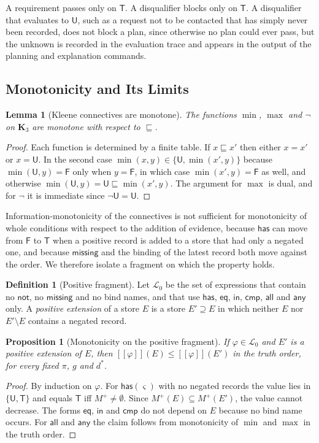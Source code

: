 \documentclass[11pt]{article}
\newtheorem{proposition}[theorem]{Proposition}
\newtheorem{lemma}[theorem]{Lemma}
\theoremstyle{definition}
\newtheorem{definition}[theorem]{Definition}
\theoremstyle{remark}
\newcommand{\Kt}{\mathbf{K}_3}
\newcommand{\vT}{\mathsf{T}}
\newcommand{\vU}{\mathsf{U}}
\newcommand{\vF}{\mathsf{F}}
\newcommand{\sem}[1]{[\![#1]\!]}
\begin{document}
A requirement passes only on $\vT$. A disqualifier blocks only on $\vT$. A disqualifier that evaluates to $\vU$, such as a request not to be contacted that has simply never been recorded, does not block a plan, since otherwise no plan could ever pass, but the unknown is recorded in the evaluation trace and appears in the output of the planning and explanation commands.

\subsection{Monotonicity and Its Limits}

\begin{lemma}[Kleene connectives are monotone]\label{lem:kleene}
The functions $\min$, $\max$ and $\neg$ on $\Kt$ are monotone with respect to $\sqsubseteq$.
\end{lemma}
\begin{proof}
Each function is determined by a finite table. If $x\sqsubseteq x'$ then either $x=x'$ or $x=\vU$. In the second case $\min(x,y)\in\{\vU,\min(x',y)\}$ because $\min(\vU,y)=\vF$ only when $y=\vF$, in which case $\min(x',y)=\vF$ as well, and otherwise $\min(\vU,y)=\vU\sqsubseteq\min(x',y)$. The argument for $\max$ is dual, and for $\neg$ it is immediate since $\neg\vU=\vU$.
\end{proof}

Information-monotonicity of the connectives is not sufficient for monotonicity of whole conditions with respect to the addition of evidence, because $\mathsf{has}$ can move from $\vF$ to $\vT$ when a positive record is added to a store that had only a negated one, and because $\mathsf{missing}$ and the binding of the latest record both move against the order. We therefore isolate a fragment on which the property holds.

\begin{definition}[Positive fragment]
Let $\mathcal{L}_0$ be the set of expressions that contain no $\mathsf{not}$, no $\mathsf{missing}$ and no bind names, and that use $\mathsf{has}$, $\mathsf{eq}$, $\mathsf{in}$, $\mathsf{cmp}$, $\mathsf{all}$ and $\mathsf{any}$ only. A \emph{positive extension} of a store $E$ is a store $E'\supseteq E$ in which neither $E$ nor $E'\setminus E$ contains a negated record.
\end{definition}

\begin{proposition}[Monotonicity on the positive fragment]\label{prop:mono}
If $\varphi\in\mathcal{L}_0$ and $E'$ is a positive extension of $E$, then $\sem{\varphi}(E)\le\sem{\varphi}(E')$ in the truth order, for every fixed $\pi$, $g$ and $d^\ast$.
\end{proposition}
\begin{proof}
By induction on $\varphi$. For $\mathsf{has}(\varsigma)$ with no negated records the value lies in $\{\vU,\vT\}$ and equals $\vT$ iff $M^{+}\neq\emptyset$. Since $M^{+}(E)\subseteq M^{+}(E')$, the value cannot decrease. The forms $\mathsf{eq}$, $\mathsf{in}$ and $\mathsf{cmp}$ do not depend on $E$ because no bind name occurs. For $\mathsf{all}$ and $\mathsf{any}$ the claim follows from monotonicity of $\min$ and $\max$ in the truth order.
\end{proof}
\end{document}
